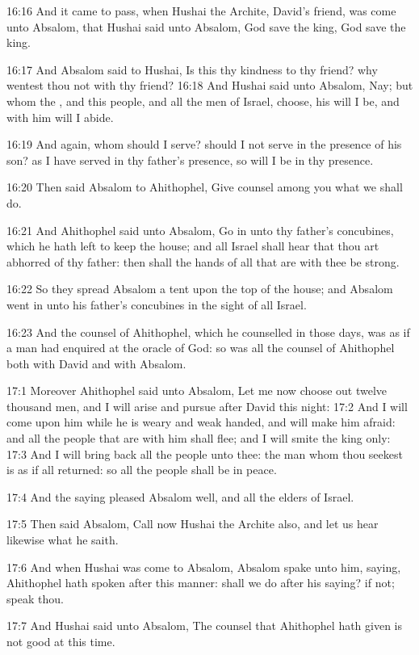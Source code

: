 16:16 And it came to pass, when Hushai the Archite, David's friend,
was come unto Absalom, that Hushai said unto Absalom, God save the
king, God save the king.

16:17 And Absalom said to Hushai, Is this thy kindness to thy friend?
why wentest thou not with thy friend?  16:18 And Hushai said unto
Absalom, Nay; but whom the \LORD, and this people, and all the men of
Israel, choose, his will I be, and with him will I abide.

16:19 And again, whom should I serve? should I not serve in the
presence of his son? as I have served in thy father's presence, so
will I be in thy presence.

16:20 Then said Absalom to Ahithophel, Give counsel among you what we
shall do.

16:21 And Ahithophel said unto Absalom, Go in unto thy father's
concubines, which he hath left to keep the house; and all Israel shall
hear that thou art abhorred of thy father: then shall the hands of all
that are with thee be strong.

16:22 So they spread Absalom a tent upon the top of the house; and
Absalom went in unto his father's concubines in the sight of all
Israel.

16:23 And the counsel of Ahithophel, which he counselled in those
days, was as if a man had enquired at the oracle of God: so was all
the counsel of Ahithophel both with David and with Absalom.

17:1 Moreover Ahithophel said unto Absalom, Let me now choose out
twelve thousand men, and I will arise and pursue after David this
night: 17:2 And I will come upon him while he is weary and weak
handed, and will make him afraid: and all the people that are with him
shall flee; and I will smite the king only: 17:3 And I will bring back
all the people unto thee: the man whom thou seekest is as if all
returned: so all the people shall be in peace.

17:4 And the saying pleased Absalom well, and all the elders of
Israel.

17:5 Then said Absalom, Call now Hushai the Archite also, and let us
hear likewise what he saith.

17:6 And when Hushai was come to Absalom, Absalom spake unto him,
saying, Ahithophel hath spoken after this manner: shall we do after
his saying? if not; speak thou.

17:7 And Hushai said unto Absalom, The counsel that Ahithophel hath
given is not good at this time.

